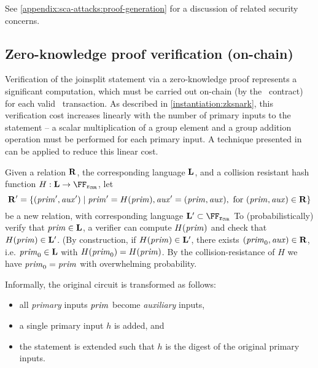 See \cref{appendix:sca-attacks:proof-generation} for a discussion of related security concerns.

\subsection{Zero-knowledge proof verification (on-chain)}

Verification of the joinsplit statement via a zero-knowledge proof represents a significant computation, which must be carried out on-chain (by the \mixer~contract) for each valid \zeth~transaction. As described in \cref{instantiation:zksnark}, this verification cost increases linearly with the number of primary inputs to the statement -- a scalar multiplication of a group element and a group addition operation must be performed for each primary input. A technique presented in \cite[Section 4.5.1]{GGPR13} can be applied to reduce this linear cost.

Given a relation $\mathbf{R}$, the corresponding language $\mathbf{L}$, and a collision
resistant hash function $H : \LANG \to \FFx{\rCURVE}$, let
\[\mathbf{R}^\prime =
\left\{ (\mathit{prim}^\prime, \mathit{aux}^\prime) \mid \mathit{prim}' = H(\mathit{prim}),
  \mathit{aux}' = (\mathit{prim}, \mathit{aux}), \allowbreak \text{ for } \allowbreak (\mathit{prim},
  \mathit{aux}) \in \mathbf{R}
\right\}
\]
be a new relation, with corresponding language $\LANG^\prime \subset
\FFx{\rCURVE}$
To (probabilistically) verify that $\mathit{prim} \in \mathbf{L}$, a verifier can compute $H(\mathit{prim})$ and check that $H(\mathit{prim}) \in \mathbf{L}^\prime$. (By construction, if $H(\mathit{prim}) \in \mathbf{L}^\prime$, there exists $(\mathit{prim}_0, \mathit{aux}) \in \mathbf{R}$, i.e. $\mathit{prim}_0 \in \mathbf{L}$ with $H(\mathit{prim}_0) = H(\mathit{prim})$. By the collision-resistance of $H$ we have $\mathit{prim}_0 = \mathit{prim}$ with overwhelming probability.

Informally, the original circuit is transformed as follows:
\begin{itemize}
  \item all \emph{primary} inputs $\mathit{prim}$ become \emph{auxiliary} inputs,
  \item a single primary input $h$ is added, and
  \item the statement is extended such that $h$ is the digest of the original primary inputs.
\end{itemize}

